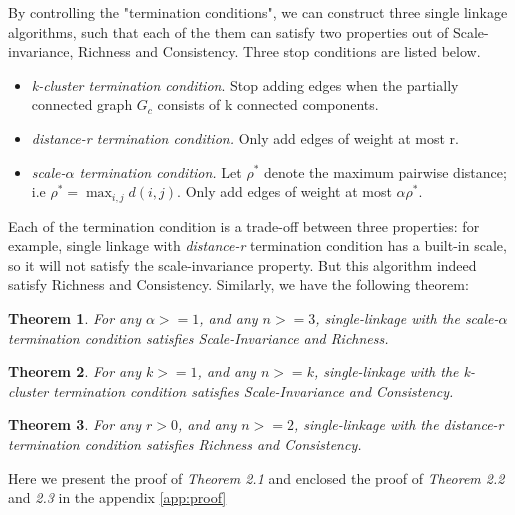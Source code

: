 \documentclass{uonmathreport}
\newtheorem{theorem}{Theorem}[section]
\begin{document}
By controlling the "termination conditions", we can construct three single linkage algorithms, such that each of the them can satisfy two properties out of Scale-invariance, Richness and Consistency. Three stop conditions are listed below\cite{Kleinberg}.
\begin{itemize}
\item \textit{k-cluster termination condition}. Stop adding edges when the partially connected graph $G_{c}$ consists of k connected components.
  
\item \textit{distance-r termination condition.} Only add edges of weight at most r.
  
\item \textit{scale-$\alpha$ termination condition.} Let $\rho^*$ denote the maximum pairwise distance; i.e $\rho^* = \max_{i,j}d(i,j)$. Only add edges of weight at most $\alpha\rho^{*}$.
\end{itemize}

Each of the termination condition is a trade-off between three properties: for example, single linkage with \textit{distance-r} termination condition has a built-in scale, so it will not satisfy the scale-invariance property. But this algorithm indeed satisfy Richness and Consistency. Similarly, we have the following theorem:
\begin{theorem}
\label{first theorem}
For any $\alpha>=1$, and any $n>=3$, single-linkage with the scale-$\alpha$ termination condition satisfies Scale-Invariance and Richness.
\end{theorem}
\begin{theorem}
\label{second theorem}
For any $k>=1$, and any $n>=k$, single-linkage with the k-cluster termination condition satisfies Scale-Invariance and Consistency.
\end{theorem}
\begin{theorem}
\label{third theorem}
For any $r>0$, and any $n>=2$, single-linkage with the distance-r termination condition satisfies Richness and Consistency.
\end{theorem}

Here we present the proof of \textit{Theorem 2.1} and enclosed the proof of \textit{Theorem 2.2} and \textit{2.3} in the appendix \ref{app:proof}
\end{document}
